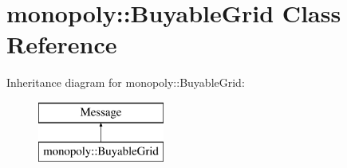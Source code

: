 \hypertarget{classmonopoly_1_1_buyable_grid}{}\section{monopoly\+:\+:Buyable\+Grid Class Reference}
\label{classmonopoly_1_1_buyable_grid}
Inheritance diagram for monopoly\+:\+:Buyable\+Grid\+:\begin{figure}[H]
\begin{center}
\leavevmode
\includegraphics[height=2.000000cm]{classmonopoly_1_1_buyable_grid}
\end{center}
\end{figure}
